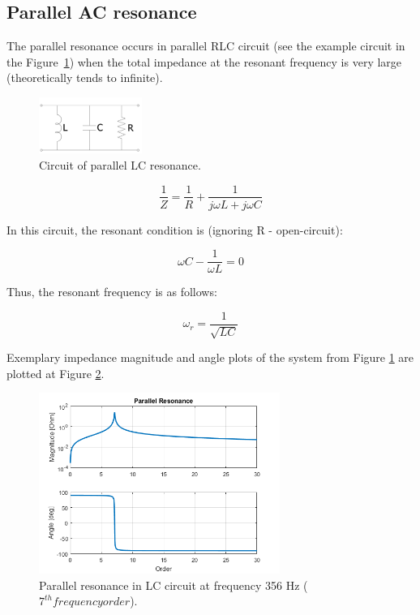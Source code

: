 \documentclass[12pt]{report} %
\begin{document}
\subsection{Parallel AC resonance}
The parallel resonance occurs in parallel RLC circuit (see the example circuit in the Figure~\ref{fig:parallelcircuit}) when the total impedance at the resonant frequency is very large (theoretically tends to infinite).

\begin{figure}[htb]
	\centering
    	\includegraphics[width=0.3\textwidth]{img/theory/parallel_circ.png}
  	\caption{Circuit of parallel LC resonance.}
  	\label{fig:parallelcircuit}
\end{figure}
\FloatBarrier

\begin{equation}
	\dfrac{1}{Z}=\dfrac{1}{R}+\dfrac{1}{j\omega L+j\omega C}
\end{equation}

In this circuit, the resonant condition is (ignoring R - open-circuit):

\begin{equation}
	\omega C-\dfrac{1}{\omega L}=0
\end{equation}

Thus, the resonant frequency is as follows:

\begin{equation}
	\omega_r =\dfrac{1}{\sqrt{LC}}
\end{equation}

Exemplary impedance magnitude and angle plots of the system from Figure \ref{fig:parallelcircuit} are plotted at Figure \ref{fig:parallelresonance}.

\begin{figure}[htb]
	\centering
    	\includegraphics[width=0.7\textwidth]{img/theory/parallel_resonance_f356.png}
  	\caption{Parallel resonance in LC circuit at frequency 356 Hz ($7^{th} frequency order$).}
  	\label{fig:parallelresonance}
\end{figure}
\FloatBarrier
\end{document}
